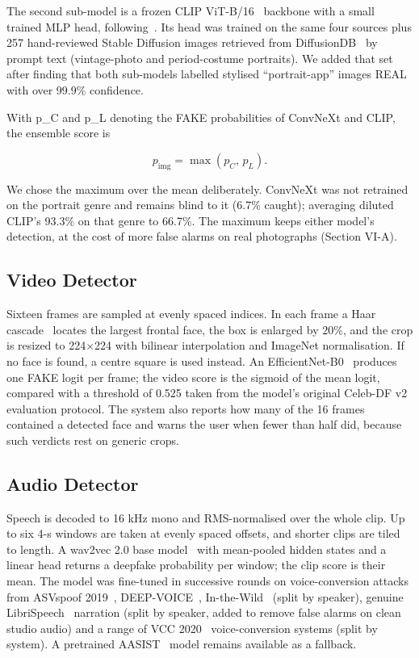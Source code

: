 \documentclass[conference]{IEEEtran}
\begin{document}
The second sub-model is a frozen CLIP ViT-B/16~\cite{clip} backbone with a small trained MLP head, following~\cite{ojha2023}. Its head was trained on the same four sources plus 257 hand-reviewed Stable Diffusion images retrieved from DiffusionDB~\cite{diffusiondb} by prompt text (vintage-photo and period-costume portraits). We added that set after finding that both sub-models labelled stylised ``portrait-app'' images REAL with over 99.9\% confidence.

With p\_C and p\_L denoting the FAKE probabilities of ConvNeXt and CLIP, the ensemble score is

\begin{equation}
p_{\mathrm{img}} = \max\left(p_{C},\, p_{L}\right).
\end{equation}

We chose the maximum over the mean deliberately. ConvNeXt was not retrained on the portrait genre and remains blind to it (6.7\% caught); averaging diluted CLIP's 93.3\% on that genre to 66.7\%. The maximum keeps either model's detection, at the cost of more false alarms on real photographs (Section VI-A).

\subsection{Video Detector}
Sixteen frames are sampled at evenly spaced indices. In each frame a Haar cascade~\cite{violajones} locates the largest frontal face, the box is enlarged by 20\%, and the crop is resized to 224$\times$224 with bilinear interpolation and ImageNet normalisation. If no face is found, a centre square is used instead. An EfficientNet-B0~\cite{efficientnet} produces one FAKE logit per frame; the video score is the sigmoid of the mean logit, compared with a threshold of 0.525 taken from the model's original Celeb-DF v2 evaluation protocol. The system also reports how many of the 16 frames contained a detected face and warns the user when fewer than half did, because such verdicts rest on generic crops.

\subsection{Audio Detector}
Speech is decoded to 16 kHz mono and RMS-normalised over the whole clip. Up to six 4-s windows are taken at evenly spaced offsets, and shorter clips are tiled to length. A wav2vec 2.0 base model~\cite{wav2vec2} with mean-pooled hidden states and a linear head returns a deepfake probability per window; the clip score is their mean. The model was fine-tuned in successive rounds on voice-conversion attacks from ASVspoof 2019~\cite{asvspoof2019}, DEEP-VOICE~\cite{deepvoice}, In-the-Wild~\cite{inthewild} (split by speaker), genuine LibriSpeech~\cite{librispeech} narration (split by speaker, added to remove false alarms on clean studio audio) and a range of VCC 2020~\cite{vcc2020} voice-conversion systems (split by system). A pretrained AASIST~\cite{aasist} model remains available as a fallback.
\end{document}
